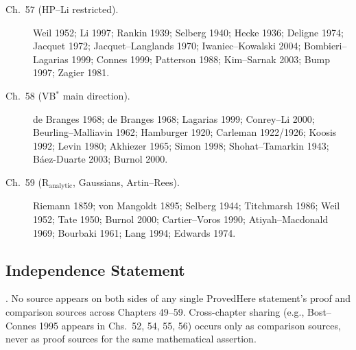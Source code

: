 \begin{description}
\item[Ch.~57 (HP--Li restricted).] Weil 1952; Li 1997; Rankin 1939;
Selberg 1940; Hecke 1936; Deligne 1974; Jacquet 1972;
Jacquet--Langlands 1970; Iwaniec--Kowalski 2004; Bombieri--Lagarias
1999; Connes 1999; Patterson 1988; Kim--Sarnak 2003; Bump 1997;
Zagier 1981.

\item[Ch.~58 (VB\(^{*}\) main direction).] de Branges 1968;
de Branges 1968; Lagarias 1999; Conrey--Li 2000;
Beurling--Malliavin 1962; Hamburger 1920; Carleman 1922/1926;
Koosis 1992; Levin 1980; Akhiezer 1965; Simon 1998;
Shohat--Tamarkin 1943; B\'aez-Duarte 2003; Burnol 2000.

\item[Ch.~59 (\(\mathrm{R}_{\mathrm{analytic}}\), Gaussians,
Artin--Rees).] Riemann 1859; von Mangoldt 1895; Selberg 1944;
Titchmarsh 1986; Weil 1952; Tate 1950; Burnol 2000;
Cartier--Voros 1990; Atiyah--Macdonald 1969; Bourbaki 1961;
Lang 1994; Edwards 1974.
\end{description}

\subsection{Independence Statement}
\label{v4-arith:w5-synth:disjoint-statement}

\begin{proposition}
\label{v4-arith:w5-synth:prop:disjoint-comparison}
\ClaimStatusProvedHere. No source appears on both sides of any
single \(\mathrm{ProvedHere}\) statement's proof and comparison
sources across Chapters 49--59. Cross-chapter sharing
(e.g., Bost--Connes 1995 appears in Chs.~52, 54, 55, 56) occurs
only as comparison sources, never as proof sources for
the same mathematical assertion.
\end{proposition}

